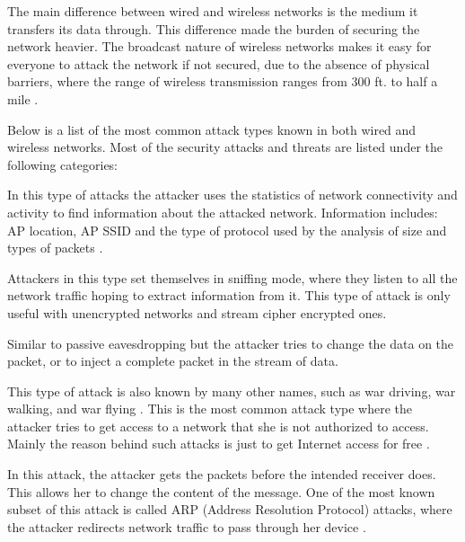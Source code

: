 \documentclass[a4paper,12pt,pagesize,headsepline,bibtotoc,titlepage]{scrartcl}
\begin{document}
The main difference between wired and wireless networks is the medium it transfers its data through. This difference made the burden of securing the network heavier. The broadcast nature of wireless networks makes it easy for everyone to attack the network if not secured, due to the absence of physical barriers, where the range of wireless transmission ranges from 300 ft. to half a mile \cite{arbaugh}.

Below is a list of the most common attack types known in both wired and wireless networks. Most of the security attacks and threats are listed under the following categories:


In this type of attacks the attacker uses the statistics of network connectivity and activity to find information about the attacked network. Information includes: AP location, AP SSID and the type of protocol used by the analysis of size and types of packets \cite{welch}.


Attackers in this type set themselves in sniffing mode, where they listen to all the network traffic hoping to extract information from it. This type of attack is only useful with unencrypted networks and stream cipher encrypted ones.


Similar to passive eavesdropping but the attacker tries to change the data on the packet, or to inject a complete packet in the stream of data.


This type of attack is also known by many other names, such as war driving, war walking, and war flying \cite{earle}. This is the most common attack type where the attacker tries to get access to a network that she is not authorized to access. Mainly the reason behind such attacks is just to get Internet access for free \cite{potter}.


In this attack, the attacker gets the packets before the intended receiver does. This allows her to change the content of the message. One of the most known subset of this attack is called ARP (Address Resolution Protocol) attacks, where the attacker redirects network traffic to pass through her device \cite{welch}.

\end{document}
